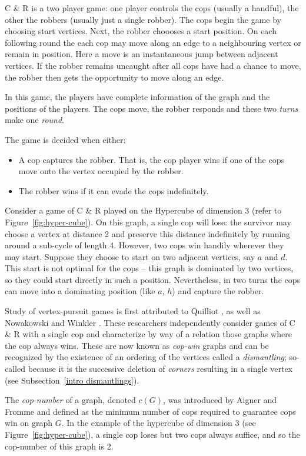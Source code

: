 C \& R is a two player game: one player controls the cops (usually a handful), the other the robbers (usually just a single robber).
The cops begin the game by choosing start vertices. Next, the robber choooses a start position.
On each following round the each cop may move along an edge to a neighbouring vertex
or remain in position.
Here a move is an instantaneous jump between adjacent vertices.
If the robber remains uncaught after all cops have had a chance to move, the
robber then gets the opportunity to move along an edge.

In this game, the players have complete information of the graph and the positions of the players.
The cops move, the robber responds and these two \textit{turns} make one \textit{round}.

The game is decided when either:
\begin{itemize}
\item A cop captures the robber. That is, the cop player wins if one of the cops move onto the vertex
occupied by the robber.
\item The robber wins if it can evade the cops indefinitely.
\end{itemize}

Consider a game of C \& R played on the Hypercube of dimension 3 (refer to Figure~\ref{fig:hyper-cube}). On this graph, a single cop will lose: the survivor may choose a vertex at distance 2 and preserve this distance indefinitely by running around a sub-cycle of length 4. However, two cops win handily wherever they may start. Suppose they choose to start on two adjacent vertices, say $a$ and $d$. This start is not optimal for the cops -- this graph is dominated by two vertices, so they could start directly in such a position. Nevertheless, in two turns the cops can move into a dominating position (like $a$, $h$) and capture the robber.

Study of vertex-pursuit games is first attributed to Quilliot \cite{quilliot1978jeux, quilliot1983problemes}, as well as Nowakowski and Winkler \cite{nowakowski1983vertex}.
These researchers independently consider games of C \& R with a single cop and characterize by way of a relation those graphs where the cop always wins. These are now known as \textit{cop-win} graphs
and can be recognized by the existence of an ordering of the vertices called a \textit{dismantling};
so-called because it is the successive deletion of \textit{corners} resulting in a single vertex (see Subsection~\ref{intro dismantlings}).

The \textit{cop-number} of a graph, denoted $c(G)$, was introduced by Aigner and Fromme  \cite{aigner1984game} and defined as the minimum number of cops required
to guarantee cops win on graph $G$. In the example of the hypercube of dimension 3 (see Figure~\ref{fig:hyper-cube}), a single cop loses but two cops always suffice, and so the cop-number of this graph is 2.

